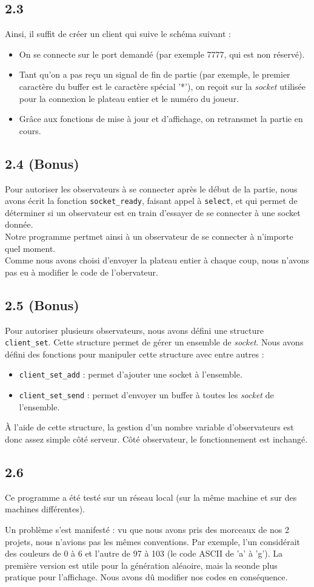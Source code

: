 \documentclass[12pt]{article}
\def\question#1{\subsection{#1}}
\begin{document}
\question{2.3}
Ainsi, il suffit de créer un client qui suive le schéma suivant :
\begin{itemize}
\item On se connecte sur le port demandé (par exemple 7777, qui est non réservé).
\item Tant qu'on a pas reçu un signal de fin de partie (par exemple, le premier caractère du buffer est le caractère spécial '*'), on reçoit sur la \textit{socket} utilisée pour la connexion le plateau entier et le numéro du joueur.
\item Grâce aux fonctions de mise à jour et d'affichage, on retransmet la partie en cours.
\end{itemize}

  

\question{2.4 (Bonus)}
Pour autoriser les observateurs à se connecter après le début de la partie, nous avons écrit la fonction \texttt{socket\_ready}, faisant appel à \texttt{select}, et qui permet de déterminer si un observateur est en train d'essayer de se connecter à une socket donnée. \\
Notre programme pertmet ainsi à un observateur de se connecter à n'importe quel moment. \\
Comme nous avons choisi d'envoyer la plateau entier à chaque coup, nous n'avons pas eu à modifier le code de l'obervateur.



\question{2.5 (Bonus)}
Pour autoriser plusieurs observateurs, nous avons défini une structure \texttt{client\_set}. Cette structure permet de gérer un ensemble de \textit{socket}. Nous avons défini des fonctions pour manipuler cette structure avec entre autres :
\begin{itemize}
\item \texttt{client\_set\_add} : permet d'ajouter une socket à l'ensemble.
\item \texttt{client\_set\_send} : permet d'envoyer un buffer à toutes les \textit{socket} de l'ensemble.
\end{itemize}
À l'aide de cette structure, la gestion d'un nombre variable d'observateurs est donc assez simple côté serveur. Côté observateur, le fonctionnement est inchangé.



\question{2.6}

Ce programme a été testé sur un réseau local (sur la même machine et sur des machines différentes).

Un problème s'est manifesté : vu que nous avons pris des morceaux de nos 2 projets, nous n'avions pas les mêmes conventions. Par exemple, l'un considérait des couleurs de 0 à 6 et l'autre de 97 à 103 (le code ASCII de 'a' à 'g'). La première version est utile pour la génération aléaoire, mais la seonde plus pratique pour l'affichage. Nous avons dû modifier nos codes en conséquence.
\end{document}
